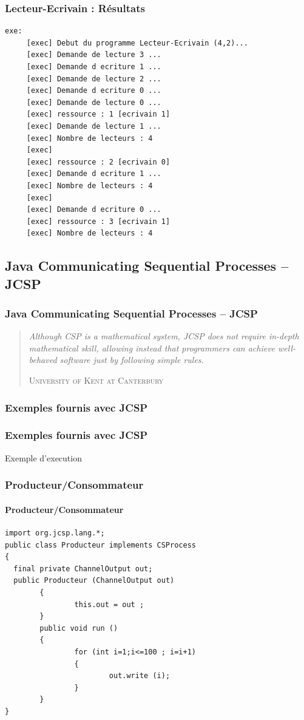 \documentclass[slidetop,11pt]{beamer}
\begin{document}
\begin{frame} [containsverbatim]
\frametitle{Lecteur-Ecrivain : Résultats}
\begin{lstlisting}[frame=trBL]   
exe:
     [exec] Debut du programme Lecteur-Ecrivain (4,2)...
     [exec] Demande de lecture 3 ...
     [exec] Demande d ecriture 1 ...
     [exec] Demande de lecture 2 ...
     [exec] Demande d ecriture 0 ...
     [exec] Demande de lecture 0 ...
     [exec] ressource : 1 [ecrivain 1]
     [exec] Demande de lecture 1 ...
     [exec] Nombre de lecteurs : 4
     [exec] 
     [exec] ressource : 2 [ecrivain 0]
     [exec] Demande d ecriture 1 ...
     [exec] Nombre de lecteurs : 4
     [exec] 
     [exec] Demande d ecriture 0 ...
     [exec] ressource : 3 [ecrivain 1]
     [exec] Nombre de lecteurs : 4
\end{lstlisting}
\end{frame}

\subsection{Java Communicating Sequential Processes – JCSP}
\begin{frame}
\frametitle{Java Communicating Sequential Processes – JCSP}
\begin{quotation}
\textit{\og Although CSP is a mathematical system, JCSP does not require in-depth mathematical skill, allowing instead that programmers can achieve well-behaved software just by following simple rules.\fg}
\begin{flushright}
\textsc{University of Kent at Canterbury}
\end{flushright}
\end{quotation}
\end{frame}

\subsubsection{Exemples fournis avec JCSP}
\begin{frame}
\frametitle{Exemples fournis avec JCSP}
Exemple d'execution
\end{frame}

\subsubsection{Producteur/Consommateur}
\begin{frame}[containsverbatim]
\framesubtitle{Producteur/Consommateur}
\begin{lstlisting}[frame=trBL,title={Producteurs-Consommateurs: Producteur.java}]
import org.jcsp.lang.*;
public class Producteur implements CSProcess
{
  final private ChannelOutput out;
  public Producteur (ChannelOutput out)
        {
                this.out = out ;
        }
        public void run ()
        {
                for (int i=1;i<=100 ; i=i+1)
                {
                        out.write (i);
                }
        }
}
\end{lstlisting}
\end{frame}
\end{document}
